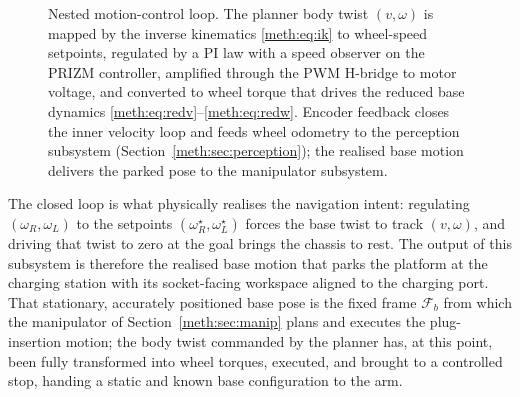 \begin{figure}[!htb]
\centering
\scriptsize
{}
\caption{Nested motion-control loop. The planner body twist $(v,\omega)$ is mapped by the inverse kinematics \eqref{meth:eq:ik} to wheel-speed setpoints, regulated by a PI law with a speed observer on the PRIZM controller, amplified through the PWM H-bridge to motor voltage, and converted to wheel torque that drives the reduced base dynamics \eqref{meth:eq:redv}--\eqref{meth:eq:redw}. Encoder feedback closes the inner velocity loop and feeds wheel odometry to the perception subsystem (Section~\ref{meth:sec:perception}); the realised base motion delivers the parked pose to the manipulator subsystem.}
\label{meth:fig:ctrlloop}
\end{figure}

The closed loop is what physically realises the navigation intent: regulating $(\omega_R,\omega_L)$ to the setpoints $(\omega_R^{\star},\omega_L^{\star})$ forces the base twist to track $(v,\omega)$, and driving that twist to zero at the goal brings the chassis to rest. The output of this subsystem is therefore the realised base motion that parks the platform at the charging station with its socket-facing workspace aligned to the charging port. That stationary, accurately positioned base pose is the fixed frame $\mathcal{F}_b$ from which the manipulator of Section~\ref{meth:sec:manip} plans and executes the plug-insertion motion; the body twist commanded by the planner has, at this point, been fully transformed into wheel torques, executed, and brought to a controlled stop, handing a static and known base configuration to the arm.


